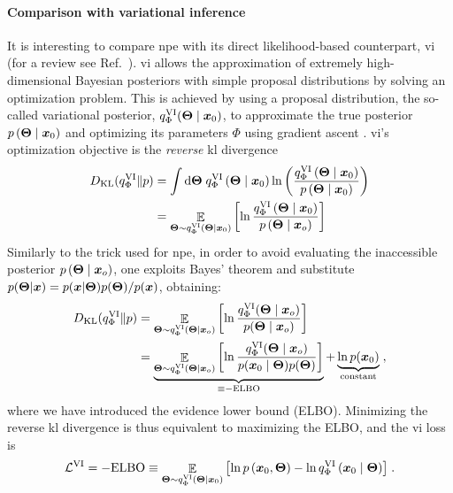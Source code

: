 \paragraph{Comparison with variational inference} 
It is interesting to compare \gls*{npe} with its direct likelihood-based counterpart, \gls*{vi} (for a review see Ref.~\cite{zhang2018advances}). \Gls*{vi} allows the approximation of extremely high-dimensional Bayesian posteriors with simple proposal distributions by solving an optimization problem. 
This is achieved by using a proposal distribution, the so-called variational posterior, $q^\text{VI}_\Phi(\bm{\Theta} \mid \bm{x}_0)$, to approximate the true posterior $p\left(\bm{\Theta} \mid \bm{x}_0\right)$ and optimizing its parameters $\Phi$ using gradient ascent \cite{Murphy:book, bottou:nips, kingma2014adam}. \Gls*{vi}'s optimization objective is the \emph{reverse} \gls*{kl} divergence
%
\begin{align} \label{eq:rkl}
	D_{\mathrm{KL}}(q^\text{VI}_\Phi \| p)  &= \int \dd \bm{\Theta}\; q^\text{VI}_\Phi\left(\bm{\Theta} \mid \bm{x}_0 \right) \ln \left(\frac{q^\text{VI}_\Phi\left(\bm{\Theta} \mid \bm{x}_0\right)}{p\left(\bm{\Theta} \mid \bm{x}_0\right)}\right) \\
	& =\mathop{\mathbb{E}}\limits_{\bm{\Theta} \sim q^\text{VI}_\Phi\left(\bm{\Theta} \mid \bm{x}_0\right)}\left[\ln \frac{q^\text{VI}_\Phi\left(\bm{\Theta} \mid \bm{x}_0\right)}{p\left(\bm{\Theta} \mid \bm{x}_o\right)}\right]
\end{align}
%
Similarly to the trick used for \gls*{npe}, in order to avoid evaluating the inaccessible posterior $p\left(\bm{\Theta} \mid \bm{x}_o\right)$, one exploits Bayes' theorem and substitute $p(\bm{\Theta}| \bm{x}) = p(\bm{x}| \bm{\Theta}) p(\bm{\Theta}) / p(\bm{x})$, obtaining:
%
\begin{align}
	D_{\mathrm{KL}}(q^\text{VI}_\Phi \| p) &=
	\mathop{\mathbb{E}}\limits_{\bm{\Theta} \sim q^\text{VI}_\Phi(\bm{\Theta} \mid \bm{x}_o)}\left[\ln \frac{q^\text{VI}_\Phi(\bm{\Theta} \mid \bm{x}_o)}{p(\bm{\Theta} \mid \bm{x}_o)}\right] \\
	& =\underbrace{\mathop{\mathbb{E}}\limits_{\bm{\Theta} \sim q^\text{VI}_\Phi(\bm{\Theta}\mid \bm{x}_o)}\left[\ln \frac{q^\text{VI}_\Phi(\bm{\Theta} \mid \bm{x}_o)}{p(\bm{x}_0 \mid \bm{\Theta}) p(\bm{\Theta})}\right]}_{\equiv-{\rm ELBO}}+ \underbrace{\ln p(\bm{x}_0)}_\text{constant} \;,
\end{align}
%
where we have introduced the evidence lower bound (ELBO). Minimizing the reverse \gls*{kl} divergence is thus equivalent to maximizing the ELBO, and the \gls*{vi} loss is
%
\begin{equation} \label{eq:lvi}
	\mathcal{L}^\text{VI} = -\mathrm{ELBO} \equiv {\mathop{\mathbb{E}}\limits_{\ensuremath{\bm{\Theta}}\sim q^\text{VI}_\Phi\left(\ensuremath{\bm{\Theta}}\mid \ensuremath{\bm{x}}_0\right)}\left[\ln p\left(\ensuremath{\bm{x}}_0, \ensuremath{\bm{\Theta}}\right)-\ln q^\text{VI}_\Phi\left(\ensuremath{\bm{x}}_0 \mid \ensuremath{\bm{\Theta}}\right)\right]} \;.
\end{equation}


